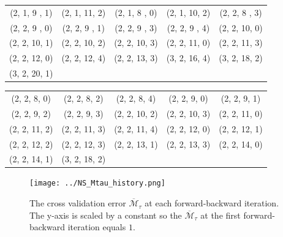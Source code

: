 \begin{center}\begin{tabular}{ccccc}
(2, 1, 9 , 1) & (2, 1, 11, 2) & (2, 1, 8 , 0) & (2, 1, 10, 2) & (2, 2, 8 , 3) \\
(2, 2, 9 , 0) & (2, 2, 9 , 1) & (2, 2, 9 , 3) & (2, 2, 9 , 4) & (2, 2, 10, 0) \\
(2, 2, 10, 1) & (2, 2, 10, 2) & (2, 2, 10, 3) & (2, 2, 11, 0) & (2, 2, 11, 3) \\
(2, 2, 12, 0) & (2, 2, 12, 4) & (2, 2, 13, 3) & (3, 2, 16, 4) & (3, 2, 18, 2) \\
(3, 2, 20, 1) & &&&
\end{tabular}
\label{tab: basis list 1}
\end{center}


\begin{center}\begin{tabular}{ccccc}
(2, 2, 8, 0) & (2, 2, 8, 2) & (2, 2, 8, 4) & (2, 2, 9, 0) & (2, 2, 9, 1)\\
(2, 2, 9, 2) & (2, 2, 9, 3) & (2, 2, 10, 2) & (2, 2, 10, 3) & (2, 2, 11, 0) \\
(2, 2, 11, 2) & (2, 2, 11, 3) & (2, 2, 11, 4) & (2, 2, 12, 0) & (2, 2, 12, 1) \\
(2, 2, 12, 2) & (2, 2, 12, 3) & (2, 2, 13, 1) &(2, 2, 13, 3) & (2, 2, 14, 0) \\
(2, 2, 14, 1) & (3, 2, 18, 2) & &\\
\end{tabular}
\label{tab: basis list 2}\end{center}

\begin{figure}[htbp]
    \begin{center}
        \texttt{[image: ../NS\_Mtau\_history.png]}
        \caption{The cross validation error $\overline{\mathcal{M}}_{\tau}$ at 
                 each forward-backward iteration. The y-axis is scaled by a constant
                 so the $\overline{\mathcal{M}}_\tau$ at the first forward-backward
                 iteration equals $1$.}
        \label{fig: NS Mtau history}
    \end{center}
\end{figure}

